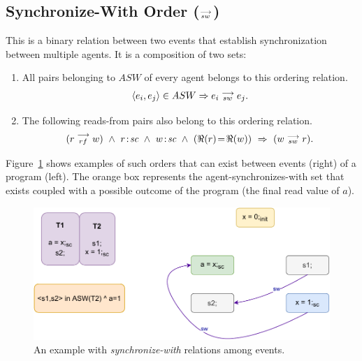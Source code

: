     \subsection{Synchronize-With Order ($\stackrel{\longrightarrow}{_{sw}} $)}
        This is a binary relation between two events that establish synchronization between multiple agents. 
        It is a composition of two sets: 
        \begin{enumerate}
            \item All pairs belonging to $ASW$ of every agent belongs to this ordering relation. 
                \begin{align*}
                    \langle e_i, e_j \rangle \in ASW \Rightarrow{} e_i\stackrel{\longrightarrow}{_{sw}}e_j. 
                \end{align*}
                    
            \item The following reads-from pairs also belong to this ordering relation\footnotemark. 
                \begin{align*}
                    (\reln{r}{rf}{w}) \ \wedge \ \et{r}{sc} \ \wedge \ \et{w}{sc} \ \wedge \ (\Re(r)\!=\!\Re(w)) \ \Rightarrow{} \
                    (\reln{w}{sw}{r}).
                \end{align*}            
        \end{enumerate}
        Figure~\ref{model:sync-with} shows examples of such orders that can exist between events (right) of a program (left).
        The orange box represents the agent-synchronizes-with set that exists coupled with a possible outcome of the program (the final read value of $a$).
        \begin{figure}[H]
            \centering
            \includegraphics[scale=0.7]{3.ECMAScriptMemoryModel/SynchronizeWith.pdf}
            \caption{An example with \textit{synchronize-with} relations among events.}
            \label{model:sync-with}
        \end{figure}

